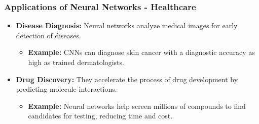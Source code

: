\documentclass[aspectratio=169]{beamer}
\begin{document}
\begin{frame}[fragile]
  \frametitle{Applications of Neural Networks - Healthcare}
  \begin{itemize}
      \item \textbf{Disease Diagnosis:} Neural networks analyze medical images for early detection of diseases.
      \begin{itemize}
          \item \textbf{Example:} CNNs can diagnose skin cancer with a diagnostic accuracy as high as trained dermatologists.
      \end{itemize}
      
      \item \textbf{Drug Discovery:} They accelerate the process of drug development by predicting molecule interactions.
      \begin{itemize}
          \item \textbf{Example:} Neural networks help screen millions of compounds to find candidates for testing, reducing time and cost.
      \end{itemize}
  \end{itemize}
\end{frame}
\end{document}
